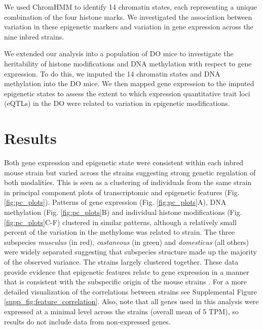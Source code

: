 \documentclass[
  11pt,
]{article}
\begin{document}
We used ChromHMM \citep{Ernst:2012ii} to identify 14 chromatin states,
each representing a unique combination of the four histone marks. We
investigated the association between variation in these epigenetic
markers and variation in gene expression across the nine inbred strains.

We extended our analysis into a population of DO mice to investigate the
heritability of histone modifications and DNA methylation with respect
to gene expression. To do this, we imputed the 14 chromatin states and
DNA methylation into the DO mice. We then mapped gene expression to the
imputed epigenetic states to assess the extent to which expression
quantitative trait loci (eQTLs) in the DO were related to variation in
epigenetic modifications.

\hypertarget{results}{%
\section{Results}\label{results}}

Both gene expression and epigenetic state were consistent within each
inbred mouse strain but varied across the strains suggesting strong
genetic regulation of both modalities. This is seen as a clustering of
individuals from the same strain in principal component plots of
transcriptomic and epigenetic features (Fig. \ref{fig:pc_plots}).
Patterns of gene expression (Fig. \ref{fig:pc_plots}A), DNA methylation
(Fig. \ref{fig:pc_plots}B) and individual histone modifications (Fig.
\ref{fig:pc_plots}C-F) clustered in similar patterns, although a
relatively small percent of the variation in the methylome was related
to strain. The three subspecies \textit{musculus} (in red),
\textit{castaneous} (in green) and \textit{domesticus} (all others) were
widely separated suggesting that subspecies structure made up the
majority of the observed variance. The  strains largely
clustered together. These data provide evidence that epigenetic features
relate to gene expression in a manner that is consistent with the
subspecific origin of the mouse strains \citep{yang2007subspecific}. For
a more detailed visualization of the correlations between strains see
Supplemental Figure \ref{supp_fig:feature_correlation}. Also, note that
all genes used in this analysis were expressed at a minimal level across
the strains (overall mean of 5 TPM), so results do not include data from
non-expressed genes.
\end{document}

